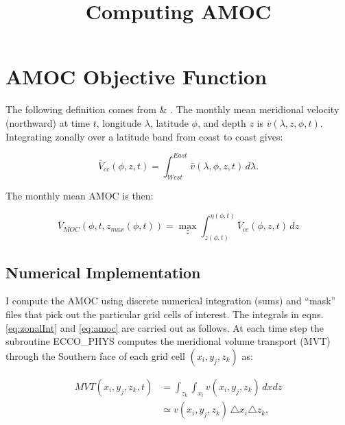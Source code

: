 \documentclass[a4paper,11pt]{article}
\title{\vspace{-10ex}Computing AMOC}
\date{\vspace{-3ex}}
\begin{document}
\maketitle



\section{AMOC Objective Function}

  The following definition comes from \cite{wunschLinear} \& \cite{wunschAndHeimbach_AMOC}. The monthly mean meridional velocity (northward) at time $t$, longitude $\lambda$, latitude $\phi$, and depth $z$ is $\bar{v}(\lambda,z,\phi,t)$. Integrating zonally over a latitude band from coast to coast gives: 
  
  \begin{equation}
   \bar{V}_{cc}(\phi,z,t) = \int_{West}^{East}\bar{v}(\lambda,\phi,z,t)\,d\lambda .
   \label{eq:zonalInt}
  \end{equation}

  The monthly mean AMOC is then: 
  
  \begin{equation}
    \bar{V}_{MOC}(\phi,t,z_{max}(\phi,t)) = \max_z\int_{z(\phi,t)}^{\eta(\phi,t)}\bar{V}_{cc}(\phi,z,t) \, dz
    \label{eq:amoc}
  \end{equation}
  
  \subsection{Numerical Implementation}
  
  I compute the AMOC using discrete numerical integration (sums) and ``mask'' files that pick out the particular grid cells of interest. The integrals in eqns. \ref{eq:zonalInt} and \ref{eq:amoc} are carried out as follows. At each time step the subroutine ECCO\_PHYS computes the meridional volume transport (MVT) through the Southern face of each grid cell $(x_i,y_j,z_k)$ as: 
  
  \begin{align}
    MVT(x_i,y_j,z_k,t) &= \int_{z_k}\int_{x_i}v(x_i,y_j,z_k) \,dx dz \\
				    &\simeq v(x_i,y_j,z_k) \,  \triangle x_i \triangle z_k ,
    \label{eq:MVT}
  \end{align}
  
\end{document}
